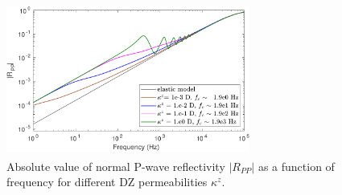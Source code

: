 \documentclass[draft]{agujournal2019}
\begin{document}
\begin{figure}
\centering

        \includegraphics[width=80mm, height=50mm]{figures/elasporo_1mm_ksen_h20e-2.pdf}
        
\caption {Absolute value of normal P-wave reflectivity $|R_{PP}|$ as a function of frequency for different DZ permeabilities $\kappa^z$.}
\label{fig:2}
\end{figure}
\end{document}

